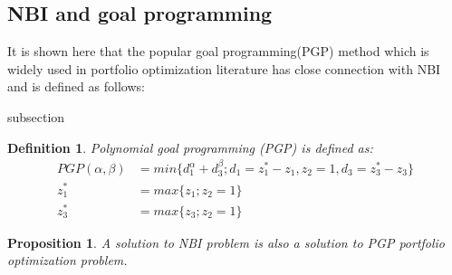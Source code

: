\documentclass[12pt,a4paper]{article}
\numberwithin{equation}{section}
\begin{document}
\subsection{NBI and goal programming}
It is shown here that the popular goal programming(PGP) method which is widely used in portfolio optimization literature has close connection with NBI and is defined as follows:
\renewcommand{\thesubsection}{\arabic{subsection}}
\newtheorem{PGPdefinition}{Definition}{subsection}
\begin{PGPdefinition}{}\label{PGPdefinition}
Polynomial goal programming (PGP) is defined as:
\begin{equation} 
\begin{split}
PGP(\alpha,\beta)&=min \{d_{1}^\alpha+d_{3}^{\beta};d_{1}=z_{1}^{*}-z_{1},z_{2}=1,d_{3}=z_{3}^{*}-z_{3}     \}  \\
z_{1}^{*}&=max \{z_{1};z_{2}=1 \} \\
z_{3}^{*}&=max \{z_{3};z_{2}=1 \}
\end{split}
\end{equation}
\end{PGPdefinition}
\renewcommand{\thesubsection}{\arabic{subsection}}
\newtheorem{NBIPGPtheorem}{Proposition}[subsection]
\begin{NBIPGPtheorem}{}\label{NBIPGPtheorem}
A solution to NBI problem is also a solution to PGP portfolio optimization problem.
\end{NBIPGPtheorem} 
\end{document}
